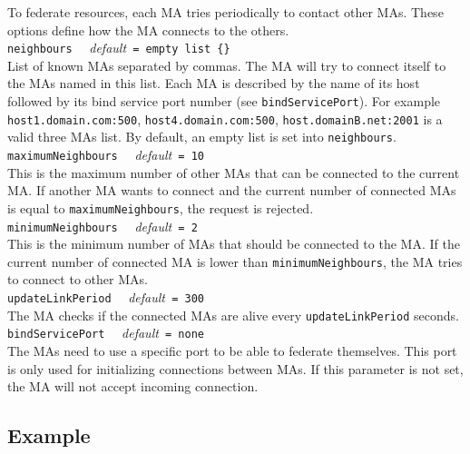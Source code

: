 To federate resources, each MA tries periodically to contact other
MAs. These options define how the MA connects to the others.\\

\noindent
\texttt{neighbours} \ \ \emph{default}\texttt{ = empty list \{\}} \\
List of known MAs separated by commas. The MA will try to connect
itself to the MAs named in this list. Each MA is described by the name
of its host followed by its bind service port number (see
\texttt{bindServicePort}). For example \texttt{host1.domain.com:500},
\texttt{host4.domain.com:500}, \texttt{host.domainB.net:2001} is a
valid three MAs list. By default, an empty list is set into
\texttt{neighbours}.\\

\noindent
\texttt{maximumNeighbours} \ \ \emph{default}\texttt{ = 10}\\ This is the
maximum number of other MAs that can be connected to the current MA.  If
another MA wants to connect and the current number of connected MAs is equal to
\texttt{maximumNeighbours}, the request is rejected.\\

\noindent
\texttt{minimumNeighbours} \ \ \emph{default}\texttt{ = 2}\\ This is
the minimum number of MAs that should be connected to the MA. If the
current number of connected MA is lower than
\texttt{minimumNeighbours}, the MA tries to connect to other MAs.\\

\noindent
\texttt{updateLinkPeriod} \ \ \emph{default}\texttt{ = 300}\\ The MA
checks if the connected MAs are alive every \texttt{updateLinkPeriod}
seconds.\\

\noindent
\texttt{bindServicePort} \ \ \emph{default}\texttt{ = none}\\ 
The MAs need to use a specific port to be able to federate themselves. This
port is only used for initializing connections between MAs. If this
parameter is not set, the MA will not accept incoming connection.\\



\subsection{Example}
\label{sec:deploy_ex}

